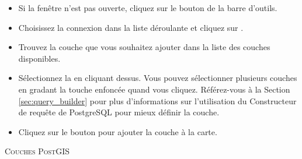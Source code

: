 \begin{itemize}
\item Si la fenêtre  n'est pas ouverte, cliquez sur le bouton  de la barre d'outils.
\item Choisissez la connexion dans la liste déroulante et cliquez sur .
\item Trouvez la couche que vous souhaitez ajouter dans la liste des couches disponibles.
\item Sélectionnez la en cliquant dessus. Vous pouvez sélectionner plusieurs couches en gradant la touche  enfoncée quand vous cliquez. Référez-vous à la Section \ref{sec:query_builder} pour plus d'informations sur l'utilisation du Constructeur de requête de PostgreSQL pour mieux définir la couche.
\item Cliquez sur le bouton  pour ajouter la couche à la carte.
\end{itemize}

\begin{Astuce}\caption{\textsc{Couches PostGIS}}
\end{Astuce}

